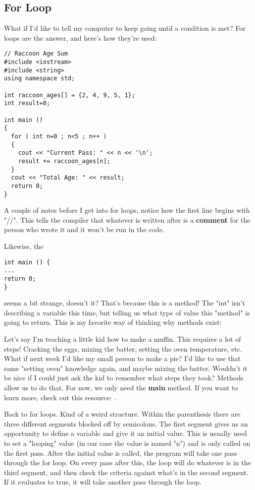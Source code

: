 \documentclass[a4paper]{article}
\begin{document}
\newpage
\subsection{For Loop}
What if I'd like to tell my computer to keep going until a condition is met? For loops are the answer, and here's how they're used:

\begin{verbatim}
// Raccoon Age Sum
#include <iostream>
#include <string>
using namespace std;

int raccoon_ages[] = {2, 4, 9, 5, 1};
int result=0;

int main ()
{
  for ( int n=0 ; n<5 ; n++ )
  {
    cout << "Current Pass: " << n << '\n';
    result += raccoon_ages[n];
  }
  cout << "Total Age: " << result;
  return 0;
}
\end{verbatim}

A couple of notes before I get into for loops, notice how the first line begins with "//". This tells the compiler that whatever is written after is a \textbf{comment} for the person who wrote it and it won't be run in the code.

Likewise, the 

\begin{verbatim}
int main () {
...
return 0;
}
\end{verbatim}

seems a bit strange, doesn't it? That's because this is a method! The "int" isn't describing a variable this time, but telling us what type of value this "method" is going to return. This is my favorite way of thinking why methods exist:

Let's say I'm teaching a little kid how to make a muffin. This requires a lot of steps! Cracking the eggs, mixing the batter, setting the oven temperature, etc. What if next week I'd like my small person to make a pie? I'd like to use that same "setting oven" knowledge again, and maybe mixing the batter. Wouldn't it be nice if I could just ask the kid to remember what steps they took? Methods allow us to do that. For now, we only need the \textbf{main} method. If you want to learn more, check out this resource: \cite{functions}.

Back to for loops. Kind of a weird structure. Within the parenthesis there are three different segments blocked off by semicolons. The first segment gives us an opportunity to define a variable and give it an initial value. This is usually used to set a "looping" value (in our case the value is named "n") and is only called on the first pass. After the initial value is called, the program will take one pass through the for loop. On every pass after this, the loop will do whatever is in the third segment, and then check the criteria against what's in the second segment. If it evaluates to true, it will take another pass through the loop.
\end{document}
